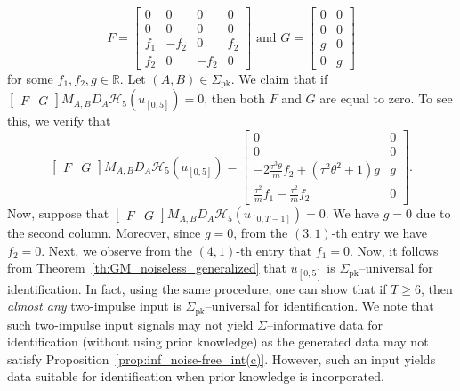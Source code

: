 \documentclass[journal,twoside,web]{ieeecolor}
\begin{document}
\begin{equation}
F=\begin{bmatrix}
0 & 0 & 0 & 0 \\
0 & 0 & 0 & 0 \\
f_1 & -f_2 & 0 & f_2 \\
f_2 & 0 & -f_2 & 0
\end{bmatrix}\text{ and }G=\begin{bmatrix}
0 & 0 \\
0 & 0 \\
g & 0 \\
0 & g 
\end{bmatrix}
\end{equation}
for some $f_1,f_2,g\in\mathbb{R}$. Let $(A,B)\in\Sigma_\text{pk}$. We claim that if $\begin{bmatrix}
F & G
\end{bmatrix}M_{A,B}D_A\mathcal{H}_{5}(u_{[0,5]})= 0$, then both $F$ and $G$ are equal to zero. To see this, we verify that
\begin{equation}
\label{eq:ex1_nonzero}
\begin{bmatrix}
F \!\!&\!\! G
\end{bmatrix}M_{A,B}D_A\mathcal{H}_{5}(u_{[0,5]})\!=\!\begin{bmatrix}
0 \!&\! 0 \\
0 \!&\! 0 \\
-2\frac{\tau^3\theta}{m}f_2+(\tau^2\theta^2+ 1)g \!&\! g \\
\frac{\tau^2}{m}f_1-\frac{\tau^2}{m}f_2 \!&\! 0 
\end{bmatrix}\!.
\end{equation}
Now, suppose that $\begin{bmatrix}
F & G
\end{bmatrix}M_{A,B}D_A\mathcal{H}_{5}(u_{[0,T-1]})= 0$. We have $g=0$ due to the second column. Moreover, since $g=0$, from the $(3,1)$-th entry we have $f_2=0$. Next, we observe from the $(4,1)$-th entry that $f_1=0$. Now, it follows from Theorem~\ref{th:GM_noiseless_generalized} that $u_{[0,5]}$ is $\Sigma_\text{pk}$--universal for identification. In fact, using the same procedure, one can show that if $T\geq 6$, then \emph{almost any} two-impulse input is \mbox{$\Sigma_\text{pk}$--universal} for identification. We note that such two-impulse input signals may not yield $\Sigma$--informative data for identification (without using prior knowledge) as the generated data may not satisfy Proposition~\ref{prop:inf_noise-free_int(c)}. However, such an input yields data suitable for identification when prior knowledge is incorporated. 
\end{document}
